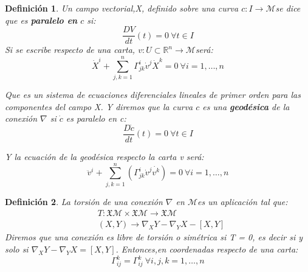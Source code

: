 \documentclass[pdftex,11pt,a4paper]{book}
\newtheorem{defi}{Definici\'on}
\newcommand{\M}{$\mathscr{M}$}
\newcommand{\XM}{\mathfrak{X}\mathcal{M} }
\begin{document}
\begin{defi}
Un campo vectorial,X, definido sobre una curva $c:I\to$\M se dice que es \textbf{paralelo en} $c$ si: 
\begin{equation}
    \frac{DV}{dt}(t)=0 \ \forall t \in I
\end{equation}
Si se escribe respecto de una carta, $v: U\subset \mathbb{R}^n \to $\M será: 
\begin{equation}
    \dot{X}^i + \sum_{j,k=1}^n \Gamma^i_{jk}\dot{v}^j\dot{X}^k= 0 \ \forall i= 1,\ldots, n
\end{equation}



Que es un sistema de ecuaciones diferenciales lineales de primer orden para las componentes del campo X.
Y diremos que la curva $c$ es una \textbf{geodésica} de la conexión $\nabla$ si $\dot{c}$ es paralelo en c:
\begin{equation}
    \frac{D\dot{c}}{dt}(t)= 0  \ \forall t \in I
\end{equation}

Y la ecuación de la geodésica respecto la carta v será:
\begin{equation}\label{eq:geodesica}
    \ddot{v}^i +\sum_{j,k=1}^n(\Gamma_{jk}^i\dot{v}^j\dot{v^k} )= 0 \ \forall i = 1, \ldots, n
\end{equation}
\end{defi}

\begin{defi}
La torsión de una conexión $\nabla$ en \M es un aplicación tal que: 
\begin{equation*}
    \begin{array}{cc}
         & T:\XM \times \XM \to \XM \\
         & (X,Y) \to \nabla_X Y - \nabla_Y X -[X,Y]
    \end{array}
\end{equation*}
Diremos que una conexión es libre de torsión o simétrica si T = 0, es decir si y solo si $ \nabla_X Y - \nabla_Y X =[X,Y] $. Entonces,en coordenadas respecto de una carta: 
\begin{equation*}
    \Gamma_{i j}^k = \Gamma_{i j}^k \ \forall i,j,k = 1, \ldots, n
\end{equation*}
\end{defi}
\end{document}
